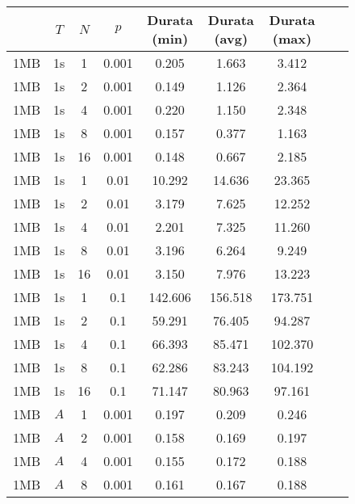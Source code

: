 \begin{figure}[H]
    \centering
    \begin{tabular}{|c|c|c|c|c|c|c|c|c|}
        \hline
        \rowcolor{tblhdrcolor}
        \multicolumn{1}{|c|}{\textbf{Dimensione File}}
                       & \multicolumn{1}{|c|}{\textbf{$T$}}
                       & \multicolumn{1}{|c|}{\textbf{$N$}}
                       & \multicolumn{1}{|c|}{\textbf{$p$}}
                       & \multicolumn{1}{|c|}{\textbf{Durata (min)}}
                       & \multicolumn{1}{|c|}{\textbf{Durata (avg)}}
                       & \multicolumn{1}{|c|}{\textbf{Durata (max)}}
        \\\hline
        1MB & 1s & 1 & 0.001 & 0.205 & 1.663 & 3.412\\\hline
        1MB & 1s & 2 & 0.001 & 0.149 & 1.126 & 2.364\\\hline
        1MB & 1s & 4 & 0.001 & 0.220 & 1.150 & 2.348\\\hline
        1MB & 1s & 8 & 0.001 & 0.157 & 0.377 & 1.163\\\hline
        1MB & 1s & 16 & 0.001 & 0.148 & 0.667 & 2.185\\\hline
        1MB & 1s & 1 & 0.01 & 10.292 & 14.636 & 23.365\\\hline
        1MB & 1s & 2 & 0.01 & 3.179 & 7.625 & 12.252\\\hline
        1MB & 1s & 4 & 0.01 & 2.201 & 7.325 & 11.260\\\hline
        1MB & 1s & 8 & 0.01 & 3.196 & 6.264 & 9.249\\\hline
        1MB & 1s & 16 & 0.01 & 3.150 & 7.976 & 13.223\\\hline
        1MB & 1s & 1 & 0.1 & 142.606 & 156.518 & 173.751\\\hline
        1MB & 1s & 2 & 0.1 & 59.291 & 76.405 & 94.287\\\hline
        1MB & 1s & 4 & 0.1 & 66.393 & 85.471 & 102.370\\\hline
        1MB & 1s & 8 & 0.1 & 62.286 & 83.243 & 104.192\\\hline
        1MB & 1s & 16 & 0.1 & 71.147 & 80.963 & 97.161\\\hline
        1MB & $A$ & 1 & 0.001 & 0.197 & 0.209 & 0.246\\\hline
        1MB & $A$ & 2 & 0.001 & 0.158 & 0.169 & 0.197\\\hline
        1MB & $A$ & 4 & 0.001 & 0.155 & 0.172 & 0.188\\\hline
        1MB & $A$ & 8 & 0.001 & 0.161 & 0.167 & 0.188\\\hline

\end{tabular}
\end{figure}
